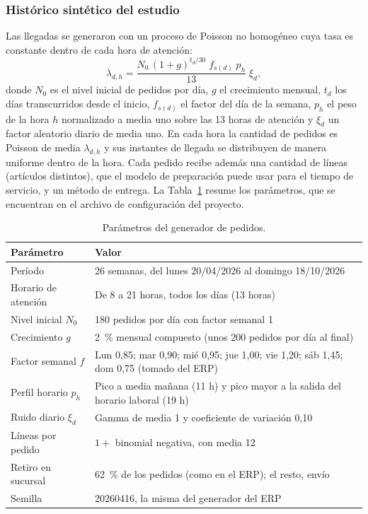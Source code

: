 \subsubsection{Histórico sintético del estudio}
Las llegadas se generaron con un proceso de Poisson no homogéneo cuya tasa es constante dentro de cada hora de atención:
\begin{equation}
  \lambda_{d,h} = \frac{N_0 \, (1 + g)^{t_d/30} \; f_{s(d)} \; p_h}{13} \; \xi_d ,
  \label{eq:tasa-generador}
\end{equation}
donde $N_0$ es el nivel inicial de pedidos por día, $g$ el crecimiento mensual, $t_d$ los días transcurridos desde el inicio, $f_{s(d)}$ el factor del día de la semana, $p_h$ el peso de la hora $h$ normalizado a media uno sobre las 13 horas de atención y $\xi_d$ un factor aleatorio diario de media uno.
En cada hora la cantidad de pedidos es Poisson de media $\lambda_{d,h}$ y sus instantes de llegada se distribuyen de manera uniforme dentro de la hora.
Cada pedido recibe además una cantidad de líneas (artículos distintos), que el modelo de preparación puede usar para el tiempo de servicio, y un método de entrega.
La Tabla~\ref{tab:parametros-generador} resume los parámetros, que se encuentran en el archivo de configuración del proyecto.

\begin{table}[htbp]
  \centering
  \caption{Parámetros del generador de pedidos.}
  \label{tab:parametros-generador}
  \begin{tabular}{lp{8.5cm}}
    \toprule
    Parámetro & Valor \\
    \midrule
    Período & 26 semanas, del lunes 20/04/2026 al domingo 18/10/2026 \\
    Horario de atención & De 8 a 21 horas, todos los días (13 horas) \\
    Nivel inicial $N_0$ & 180 pedidos por día con factor semanal 1 \\
    Crecimiento $g$ & 2~\% mensual compuesto (unos 200 pedidos por día al final) \\
    Factor semanal $f$ & Lun 0,85; mar 0,90; mié 0,95; jue 1,00; vie 1,20; sáb 1,45; dom 0,75 (tomado del ERP) \\
    Perfil horario $p_h$ & Pico a media mañana (11 h) y pico mayor a la salida del horario laboral (19 h) \\
    Ruido diario $\xi_d$ & Gamma de media 1 y coeficiente de variación 0,10 \\
    Líneas por pedido & $1 +$ binomial negativa, con media 12 \\
    Retiro en sucursal & 62~\% de los pedidos (como en el ERP); el resto, envío \\
    Semilla & 20260416, la misma del generador del ERP \\
    \bottomrule
  \end{tabular}
\end{table}

